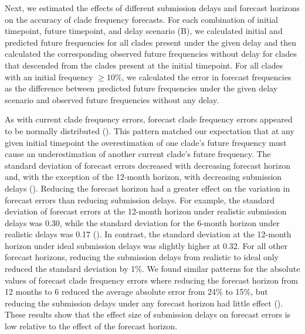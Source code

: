 \documentclass[9pt,lineno]{elife}
\begin{document}
Next, we estimated the effects of different submission delays and forecast horizons on the accuracy of clade frequency forecasts.
For each combination of initial timepoint, future timepoint, and delay scenario (B), we calculated initial and predicted future frequencies for all clades present under the given delay and then calculated the corresponding observed future frequencies without delay for clades that descended from the clades present at the initial timepoint.
For all clades with an initial frequency $\ge$10\%, we calculated the error in forecast frequencies as the difference between predicted future frequencies under the given delay scenario and observed future frequencies without any delay.

As with current clade frequency errors, forecast clade frequency errors appeared to be normally distributed ().
This pattern matched our expectation that at any given initial timepoint the overestimation of one clade's future frequency must cause an underestimation of another current clade's future frequency.
The standard deviation of forecast errors decreased with decreasing forecast horizon and, with the exception of the 12-month horizon, with decreasing submission delays ().
Reducing the forecast horizon had a greater effect on the variation in forecast errors than reducing submission delays.
For example, the standard deviation of forecast errors at the 12-month horizon under realistic submission delays was 0.30, while the standard deviation for the 6-month horizon under realistic delays was 0.17 ().
In contrast, the standard deviation at the 12-month horizon under ideal submission delays was slightly higher at 0.32.
For all other forecast horizons, reducing the submission delays from realistic to ideal only reduced the standard deviation by 1\%.
We found similar patterns for the absolute values of forecast clade frequency errors where reducing the forecast horizon from 12 months to 6 reduced the average absolute error from 24\% to 15\%, but reducing the submission delays under any forecast horizon had little effect ().
These results show that the effect size of submission delays on forecast errors is low relative to the effect of the forecast horizon.
\end{document}
